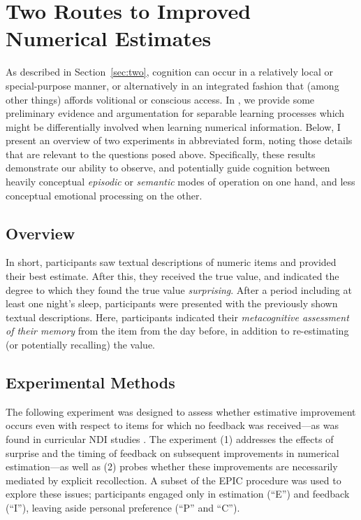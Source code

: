 \graphicspath{{two-routes-estimation/}}

\chapter{Two Routes to Improved Numerical Estimates}
\label{chap:two}

As described in Section~\ref{sec:two}, cognition can occur in a relatively local
or special-purpose manner, or alternatively in an integrated fashion that (among
other things) affords volitional or conscious access. In
\cite{clark_known_2010}, we provide some preliminary evidence and argumentation
for separable learning processes which might be differentially involved when
learning numerical information. Below, I present an overview of two experiments
in abbreviated form, noting those details that are relevant to the questions
posed above. Specifically, these results demonstrate our ability to observe, and
potentially guide cognition between heavily conceptual \emph{episodic} or
\emph{semantic} modes of operation on one hand, and less conceptual emotional
processing on the other.

\section{Overview}

In short, participants saw textual descriptions of numeric items and provided
their best estimate. After this, they received the true value, and indicated the
degree to which they found the true value \emph{surprising}. After a period
including at least one night's sleep, participants were presented with the
previously shown textual descriptions.  Here, participants indicated their
\emph{metacognitive assessment of their memory} from the item from the day
before, in addition to re-estimating (or potentially recalling) the value.

\section{Experimental Methods}

The following experiment was designed to assess whether estimative improvement
occurs even with respect to items for which no feedback was received---as was
found in curricular NDI studies
\cite[e.g.,][]{munnich_numerically-driven_2004,ranney_designing_2008}. The
experiment (1) addresses the effects of surprise and the timing of feedback on
subsequent improvements in numerical estimation---as well as (2) probes whether
these improvements are necessarily mediated by explicit recollection. A subset
of the EPIC procedure was used to explore these issues; participants engaged
only in estimation (``E'') and feedback (``I''), leaving aside personal
preference (``P'' and ``C''). 

